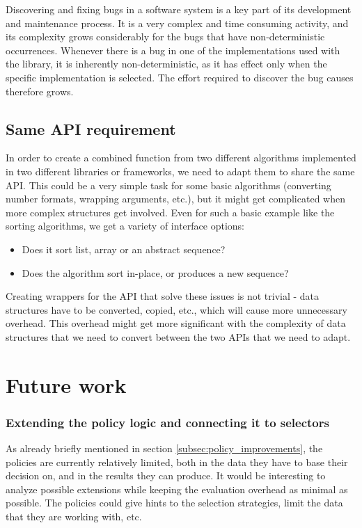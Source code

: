 Discovering and fixing bugs in a software system is a key part of its development and maintenance process. It is a very complex and time consuming activity, and its complexity grows considerably for the bugs that have non-deterministic occurrences. Whenever there is a bug in one of the implementations used with the library, it is inherently non-deterministic, as it has effect only when the specific implementation is selected. The effort required to discover the bug causes therefore grows.

\subsection{Same API requirement}

In order to create a combined function from two different algorithms implemented in two different libraries or frameworks, we need to adapt them to share the same API. This could be a very simple task for some basic algorithms (converting number formats, wrapping arguments, etc.), but it might get complicated when more complex structures get involved. Even for such a basic example like the sorting algorithms, we get a variety of interface options:

\begin{itemize}
	\item Does it sort list, array or an abstract sequence?
	\item Does the algorithm sort in-place, or produces a new sequence?
\end{itemize}

Creating wrappers for the API that solve these issues is not trivial - data structures have to be converted, copied, etc., which will cause more unnecessary overhead. This overhead might get more significant with the complexity of data structures that we need to convert between the two APIs that we need to adapt.

\section{Future work}

\subsubsection{Extending the policy logic and connecting it to selectors}

As already briefly mentioned in section \ref{subsec:policy_improvements}, the policies are currently relatively limited, both in the data they have to base their decision on, and in the results they can produce. It would be interesting to analyze possible extensions while keeping the evaluation overhead as minimal as possible. The policies could give hints to the selection strategies, limit the data that they are working with, etc.

